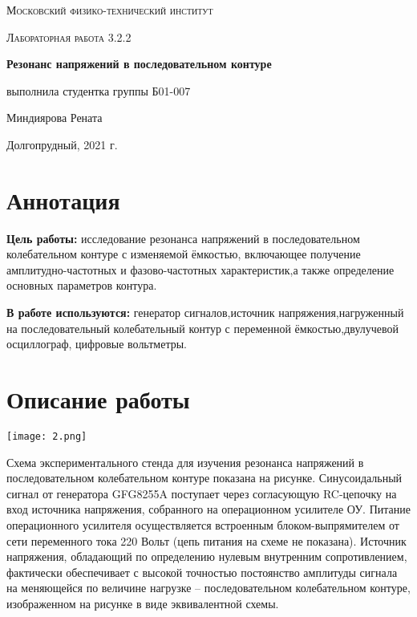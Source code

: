 \documentclass[a4paper,12pt]{extreport}
\begin{document}
\begin{titlepage}
	\centering
	\vspace{5cm}
	{\scshape\LARGE Московский физико-технический институт \par}
	\vspace{4cm}
	{\scshape\Large Лабораторная работа 3.2.2 \par}
	\vspace{1cm}
	{\huge\bfseries Резонанс напряжений в последовательном контуре  \par}
	\vspace{1cm}
	\vfill
\begin{flushright}
	{\large выполнила студентка группы Б01-007}\par
	\vspace{0.3cm}
	{\LARGE Миндиярова Рената}
\end{flushright}
\vfill

	Долгопрудный, 2021 г.
\end{titlepage}

	\section*{Аннотация}
	
	\hspace{\parindent}\textbf{Цель работы:} исследование резонанса напряжений в последовательном колебательном контуре с изменяемой ёмкостью, включающее получение амплитудно-частотных и фазово-частотных характеристик,а также определение основных параметров контура.
	
	\textbf{В работе используются:} генератор сигналов,источник напряжения,нагруженный на последовательный колебательный контур с переменной ёмкостью,двулучевой осциллограф, цифровые вольтметры.
	
	\section*{Описание работы}
\begin{center}
\texttt{[image: 2.png]}
\end{center}
Схема экспериментального стенда для изучения резонанса напряжений в последовательном колебательном контуре показана на рисунке. Синусоидальный сигнал от генератора GFG8255A поступает через согласующую RC-цепочку на вход источника напряжения, собранного на операционном усилителе ОУ. Питание операционного усилителя осуществляется
встроенным блоком-выпрямителем от сети переменного тока 220 Вольт (цепь питания на
схеме не показана). Источник напряжения, обладающий по определению нулевым внутренним сопротивлением, фактически обеспечивает с высокой точностью постоянство амплитуды сигнала на меняющейся по величине нагрузке – последовательном колебательном контуре, изображенном на рисунке в виде эквивалентной схемы.
\end{document}
